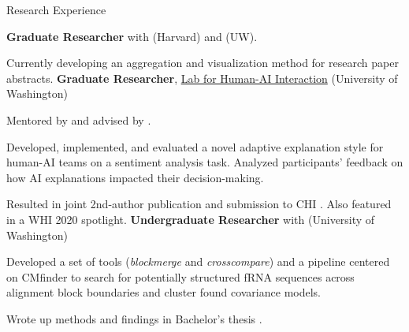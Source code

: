 \begin{rubric}{Research Experience}

	\textbf{Graduate Researcher} with \pGlassmanE{} (Harvard) and \pWeldD{} (UW).
	\par Currently developing an aggregation and visualization method for research paper abstracts.
	\textbf{Graduate Researcher}, \href{http://hai.cs.washington.edu}{Lab for Human-AI Interaction} (University of Washington)
	\par Mentored by \pBansalG{} and advised by \pWeldD{}.
	\par Developed, implemented, and evaluated a novel adaptive explanation style for human-AI teams on a sentiment analysis task. Analyzed participants' feedback on how AI explanations impacted their decision-making.
	\par Resulted in joint 2nd-author publication and submission to CHI \cite{bansal2020does}. Also featured in a WHI 2020 spotlight.
\entry*[2018 -- 2019] %
    \textbf{Undergraduate Researcher} with \pRuzzoL{} (University of Washington)
    \par Developed a set of tools (\textit{blockmerge} and \textit{crosscompare}) and a pipeline centered on CMfinder to search for potentially structured fRNA sequences across alignment block boundaries and cluster found covariance models.
    \par Wrote up methods and findings in Bachelor's thesis \cite{zhou2019thesis}.
\end{rubric}